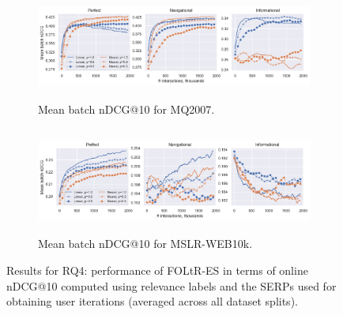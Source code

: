 \begin{figure}[t]
	\centering
	\begin{subfigure}{1\textwidth} \centering
		\includegraphics[width=13cm, height=3.5cm]{images/RQ4/mq2007_foltr_online nDCG_both_c2000_ps.png}
		\caption{Mean batch nDCG@10 for MQ2007.}
		\label{fig:mq2007-rq4}
	\end{subfigure}
	\begin{subfigure}{1\textwidth} \centering
		\includegraphics[width=13cm, height=3.5cm]{images/RQ4/mslr10k_foltr_online nDCG_both_c2000_ps.png}
		\caption{Mean batch nDCG@10 for MSLR-WEB10k.}
		\label{fig:mslr10k-rq4}
	\end{subfigure}
	\caption{Results for RQ4: performance of FOLtR-ES in terms of online nDCG@10 computed using relevance labels and the SERPs used for obtaining user iterations (averaged across all dataset splits). \label{fig:RQ4}} 
\end{figure}

